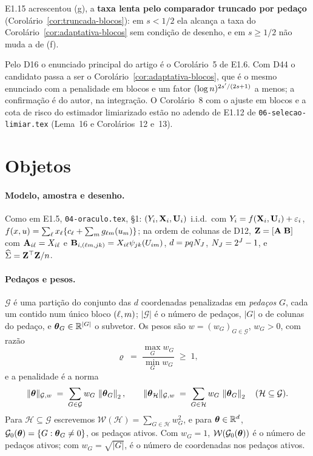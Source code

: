 \documentclass[11pt,a4paper]{article}
\newcommand{\Amat}{\mathbf{A}}
\newcommand{\Bmat}{\mathbf{B}}
\newcommand{\Gcal}{\mathcal{G}}
\newcommand{\Gzero}{\mathcal{G}_{0}}
\newcommand{\Hcal}{\mathcal{H}}
\newcommand{\nGw}[1]{\lVert #1\rVert_{\mathcal{G},w}}
\begin{document}
E1.15 acrescentou (g), a \textbf{taxa lenta pelo comparador truncado por
pedaço} (Corolário~\ref{cor:truncada-blocos}): em $s < 1/2$ ela alcança a taxa
do Corolário~\ref{cor:adaptativa-blocos} sem condição de desenho, e em
$s \ge 1/2$ não muda a de (f).

Pelo D16 o enunciado principal do artigo é o Corolário~5 de E1.6. Com D44 o
candidato passa a ser o Corolário~\ref{cor:adaptativa-blocos}, que é o mesmo
enunciado com a penalidade em blocos e um fator $(\log n)^{2s'/(2s+1)}$ a
menos; a confirmação é do autor, na integração. O Corolário~8 com o ajuste
em blocos e a cota de risco do estimador limiarizado estão no adendo de E1.12
de \texttt{06-selecao-limiar.tex} (Lema~16 e Corolários~12 e~13).

\section{Objetos}

\paragraph{Modelo, amostra e desenho.} Como em E1.5, \texttt{04-oraculo.tex},
§1: $(Y_{i},\mathbf{X}_{i},\mathbf{U}_{i})$ i.i.d.\ com $Y_{i} = f(\mathbf{X}_{i},\mathbf{U}_{i}) +
\varepsilon_{i}$, $f(x,u) = \sum_{\ell}x_{\ell}\{c_{\ell} +
\sum_{m}g_{\ell m}(u_{m})\}$; na ordem de colunas de D12,
$\bZ = [\Amat\;\Bmat]$ com $\Amat_{i\cv} = X_{i\cv}$ e
$\Bmat_{i,(\cv\md,\lev\tsl)} = X_{i\cv}\wav{\lev}{\tsl}(U_{i\md})$,
$d = pqN_{J}$, $N_{J} = 2^{J}-1$, e $\widehat{\Sigma} = \mathbf{Z}^{\top}\mathbf{Z}/n$.

\paragraph{Pedaços e pesos.} $\Gcal$ é uma partição do conjunto das $d$
coordenadas penalizadas em \emph{pedaços} $G$, cada um contido num único bloco
$(\ell,m)$; $|\Gcal|$ é o número de pedaços, $|G|$ o de colunas do pedaço, e
$\boldsymbol{\theta}_{G} \in \mathbb{R}^{|G|}$ o subvetor. Os pesos são $w = (w_{G})_{G\in\Gcal}$,
$w_{G} > 0$, com razão
\[
  \varrho \;=\; \frac{\max_{G}w_{G}}{\min_{G}w_{G}} \;\ge\; 1 ,
\]
e a penalidade é a norma
\[
  \nGw{\btheta} \;=\; \sum_{G\in\Gcal} w_{G}\,\norm{\btheta_{G}}_{2},
  \qquad
  \nGw{\btheta_{\Hcal}} \;=\; \sum_{G\in\Hcal} w_{G}\,\norm{\btheta_{G}}_{2}
  \quad (\Hcal \subseteq \Gcal).
\]
Para $\Hcal \subseteq \Gcal$ escrevemos $\mathcal{W}(\Hcal) = \sum_{G\in\Hcal}w_{G}^{2}$,
e para $\boldsymbol{\theta} \in \mathbb{R}^{d}$, $\Gzero(\btheta) = \{G : \btheta_{G} \ne 0\}$, os
pedaços ativos. Com $w_{G} = 1$, $\mathcal{W}(\Gzero(\btheta))$ é o número de pedaços
ativos; com $w_{G} = \sqrt{|G|}$, é o número de coordenadas nos pedaços
ativos.
\end{document}
